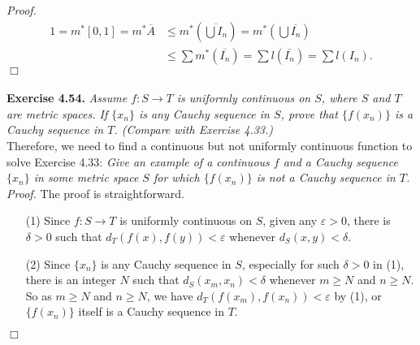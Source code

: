 \documentclass{article}
\begin{document}
\emph{Proof.}
\begin{align*}
1
= m^{*}[0, 1]
= m^{*}\overline{A}
&\leq m^{*}\left( \overline{\bigcup I_n} \right)
= m^{*}\left( \bigcup \overline{I_n} \right) \\
&\leq \sum m^{*}(\overline{I_n})
= \sum l(\overline{I_n})
= \sum l(I_n).
\end{align*}
$\Box$ \\\\



\textbf{Exercise 4.54.}
\emph{Assume $f: S \rightarrow T$ is uniformly continuous on $S$,
where $S$ and $T$ are metric spaces.
If $\{x_n\}$ is any Cauchy sequence in $S$,
prove that $\{f(x_n)\}$ is a Cauchy sequence in $T$.
(Compare with Exercise 4.33.)} \\

Therefore, we need to find a continuous but not uniformly continuous function
to solve Exercise 4.33:
\emph{Give an example of a continuous $f$ and a Cauchy sequence $\{x_n\}$
in some metric space $S$ for which $\{f(x_n)\}$ is not a Cauchy sequence in $T$.} \\

\emph{Proof.}
The proof is straightforward.
\begin{enumerate}
\item[(1)]
Since $f: S \rightarrow T$ is uniformly continuous on $S$,
given any $\varepsilon > 0$, there is $\delta > 0$ such that
$d_T(f(x), f(y)) < \varepsilon$ whenever $d_S(x, y) < \delta$.
\item[(2)]
Since $\{x_n\}$ is any Cauchy sequence in $S$,
especially for such $\delta > 0$ in (1), there is an integer $N$ such that
$d_S(x_m, x_n) < \delta$ whenever $m \geq N$ and $n \geq N$.
So as $m \geq N$ and $n \geq N$, we have
$d_T(f(x_m), f(x_n)) < \varepsilon$ by (1),
or $\{f(x_n)\}$ itself is a Cauchy sequence in $T$.
\end{enumerate}
$\Box$ \\\\
\end{document}
